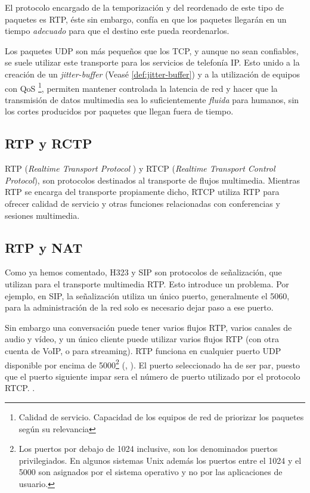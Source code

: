 El protocolo encargado de la temporización y del reordenado de este tipo de paquetes es RTP, éste sin embargo, confía en que los paquetes llegarán en un tiempo \emph{adecuado} para que el destino este pueda reordenarlos. 

Los paquetes UDP son más pequeños que los TCP, y aunque no sean confiables, se suele utilizar este transporte para los servicios de telefonía IP. Esto unido a la creación de un \emph{jitter-buffer} (Veasé \ref{def:jitter-buffer})  y a la utilización de equipos con QoS \footnote{Calidad de servicio. Capacidad de los equipos de red de priorizar los paquetes según su relevancia}, permiten mantener controlada la latencia de red y hacer que la transmisión de datos multimedia sea lo suficientemente \emph{fluida} para humanos, sin los cortes producidos por paquetes que llegan fuera de tiempo. 

\subsection{RTP y RCTP}
\label{sec:rtp}

RTP (\emph{Realtime Transport Protocol }) y RTCP (\emph{Realtime Transport Control Protocol}), son protocolos destinados al transporte de flujos multimedia. Mientras RTP se encarga del transporte propiamente dicho, RTCP utiliza RTP para ofrecer calidad de servicio y otras funciones relacionadas con conferencias y sesiones multimedia.

\subsection{RTP y  NAT}
\label{sec:rtp-y-las}

Como ya hemos comentado, H323 y SIP son protocolos de señalización, que utilizan para el transporte multimedia RTP. Esto introduce un problema. Por ejemplo, en SIP, la señalización utiliza un único puerto, generalmente el 5060, para la administración de la red solo es necesario dejar paso a ese puerto.

Sin embargo una conversación puede tener varios flujos RTP, varios canales de audio y vídeo, y un único cliente puede utilizar varios flujos RTP (con otra cuenta de VoIP, o para streaming). RTP funciona en cualquier puerto UDP disponible por encima de 5000\footnote{Los puertos por debajo de 1024 inclusive, son los denominados puertos privilegiados. En algunos sistemas Unix además los puertos entre el 1024 y el 5000 son asignados por el sistema operativo y no por las aplicaciones de usuario.} (\cite{rfc3551}, \cite{rfc3550}). El puerto seleccionado ha de ser par, puesto que el puerto siguiente impar sera el número de puerto utilizado por el protocolo RTCP. \cite{rfc4961} . 


